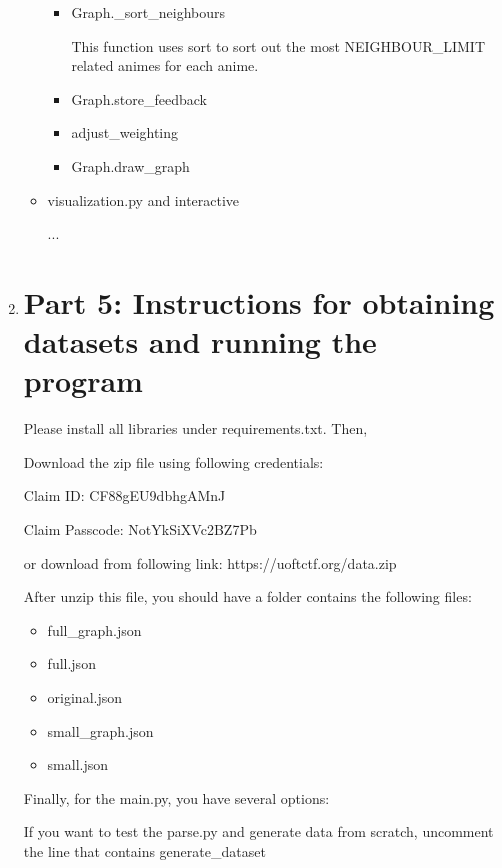 \documentclass[12pt]{article}
\begin{document}
\begin{enumerate}
\begin{text}
\begin{itemize}
\begin{itemize}
        \item Graph.\_sort\_neighbours
        
            This function uses sort to sort out the most NEIGHBOUR\_LIMIT related animes for each anime.
            
        \item Graph.store\_feedback
        
        \item adjust\_weighting
        
        \item Graph.draw\_graph
    \end{itemize}
    

    \item visualization.py and interactive
    
    ...
\end{itemize}

\end{text}

\newpage

\item \section*{Part 5: Instructions for obtaining datasets and running the program}

\begin{text}
Please install all libraries under requirements.txt. Then,

Download the zip file using following credentials:

Claim ID: CF88gEU9dbhgAMnJ

Claim Passcode: NotYkSiXVc2BZ7Pb

or download from following link: https://uoftctf.org/data.zip

After unzip this file, you should have a folder contains the following files:

\begin{itemize}
    \item full\_graph.json
    \item full.json
    \item original.json
    \item small\_graph.json
    \item small.json
\end{itemize}

Finally, for the main.py, you have several options: 

If you want to test the parse.py and generate data from scratch, uncomment the line that contains generate\_dataset


\end{text}
\end{enumerate}
\end{document}
